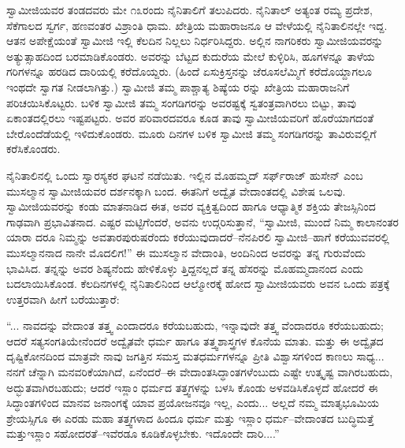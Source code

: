 ಸ್ವಾಮೀಜಿಯವರ ತಂಡದವರು ಮೇ ೧೩ರಂದು ನೈನಿತಾಲಿಗೆ ತಲುಪಿದರು. ನೈನಿತಾಲ್ ಅತ್ಯಂತ ರಮ್ಯ ಪ್ರದೇಶ, ಸೆಕೆಗಾಲದ ಸ್ವರ್ಗ, ಹಣವಂತರ ವಿಶ್ರಾಂತಿ ಧಾಮ. ಖೇತ್ರಿಯ ಮಹಾರಾಜನೂ ಆ ವೇಳೆಯಲ್ಲಿ ನೈನಿತಾಲಿನಲ್ಲೇ ಇದ್ದ. ಆತನ ಅಪೇಕ್ಷೆಯಂತೆ ಸ್ವಾಮೀಜಿ ಇಲ್ಲಿ ಕೆಲದಿನ ನಿಲ್ಲಲು ನಿರ್ಧರಿಸಿದ್ದರು. ಅಲ್ಲಿನ ನಾಗರಿಕರು ಸ್ವಾಮೀಜಿಯವರನ್ನು ಅತ್ಯುತ್ಸಾಹದಿಂದ ಬರಮಾಡಿಕೊಂಡರು. ಅವರನ್ನು ಬೆಟ್ಟದ ಕುದುರೆಯ ಮೇಲೆ ಕುಳ್ಳಿರಿಸಿ, ಹೂಗಳನ್ನೂ ತಾಳೆಯ ಗರಿಗಳನ್ನೂ ಹರಡಿದ ದಾರಿಯಲ್ಲಿ ಕರೆದೊಯ್ದರು. (ಹಿಂದೆ ಏಸುಕ್ರಿಸ್ತನನ್ನು ಜೆರೂಸಲೆಮ್ಮಿಗೆ ಕರೆದೊಯ್ದಾಗಲೂ ಇಂಥದೇ ಸ್ವಾಗತ ನೀಡಲಾಗಿತ್ತು.) ಸ್ವಾಮೀಜಿ ತಮ್ಮ ಪಾಶ್ಚಾತ್ಯ ಶಿಷ್ಯೆಯ ರನ್ನು ಖೇತ್ರಿಯ ಮಹಾರಾಜನಿಗೆ ಪರಿಚಯಿಸಿಕೊಟ್ಟರು. ಬಳಿಕ ಸ್ವಾಮೀಜಿ ತಮ್ಮ ಸಂಗಡಿಗರನ್ನು ಅವರಷ್ಟಕ್ಕೆ ಸ್ವತಂತ್ರವಾಗಿರಲು ಬಿಟ್ಟು, ತಾವು ಏಕಾಂತದಲ್ಲಿರಲು ಇಷ್ಟಪಟ್ಟರು. ಅವರ ಪರಿವಾರದವರೂ ಕೂಡ ತಾವು ಸ್ವಾಮೀಜಿಯವರಿಗೆ ಹೊರೆಯಾಗದಂತೆ ಬೇರೊಂದೆಡೆಯಲ್ಲಿ ಇಳಿದುಕೊಂಡರು. ಮೂರು ದಿನಗಳ ಬಳಿಕ ಸ್ವಾಮೀಜಿ ತಮ್ಮ ಸಂಗಡಿಗರನ್ನು ತಾವಿರುವಲ್ಲಿಗೆ ಕರೆಸಿಕೊಂಡರು.

ನೈನಿತಾಲಿನಲ್ಲಿ ಒಂದು ಸ್ವಾರಸ್ಯಕರ ಘಟನೆ ನಡೆಯಿತು. ಇಲ್ಲಿನ ಮೊಹಮ್ಮದ್ ಸರ್ಫ್​ರಾಜ್ ಹುಸೇನ್ ಎಂಬ ಮುಸಲ್ಮಾನ ಸ್ವಾಮೀಜಿಯವರ ದರ್ಶನಕ್ಕಾಗಿ ಬಂದ. ಈತನಿಗೆ ಅದ್ವೈತ ವೇದಾಂತದಲ್ಲಿ ವಿಶೇಷ ಒಲವು. ಸ್ವಾಮೀಜಿಯವರನ್ನು ಕಂಡು ಮಾತನಾಡಿದ ಈತ, ಅವರ ವ್ಯಕ್ತಿತ್ವದಿಂದ ಹಾಗೂ ಆಧ್ಯಾತ್ಮಿಕ ಶಕ್ತಿಯ ತೇಜಸ್ಸಿನಿಂದ ಗಾಢವಾಗಿ ಪ್ರಭಾವಿತನಾದ. ಎಷ್ಟರ ಮಟ್ಟಿಗೆಂದರೆ, ಅವನು ಉದ್ಗರಿಸುತ್ತಾನೆ, “ಸ್ವಾಮೀಜಿ, ಮುಂದೆ ನಿಮ್ಮ ಕಾಲಾನಂತರ ಯಾರಾ ದರೂ ನಿಮ್ಮನ್ನು ಅವತಾರಪುರುಷರೆಂದು ಕರೆಯುವುದಾದರೆ–ನೆನಪಿರಲಿ ಸ್ವಾಮೀಜಿ–ಹಾಗೆ ಕರೆಯುವವರಲ್ಲಿ ಮುಸಲ್ಮಾನನಾದ ನಾನೇ ಮೊದಲಿಗ!” ಈ ಮುಸಲ್ಮಾನ ವೇದಾಂತಿ, ಅಂದಿನಿಂದ ಅವರನ್ನು ತನ್ನ ಗುರುವೆಂದು ಭಾವಿಸಿದ. ತನ್ನನ್ನು ಅವರ ಶಿಷ್ಯನೆಂದು ಹೇಳಿಕೊಳ್ಳು ತ್ತಿದ್ದನಲ್ಲದೆ ತನ್ನ ಹೆಸರನ್ನು ಮೊಹಮ್ಮದಾನಂದ ಎಂದು ಬದಲಾಯಿಸಿಕೊಂಡ. ಕೆಲದಿನಗಳಲ್ಲಿ ನೈನಿತಾಲಿನಿಂದ ಆಲ್ಮೋರಕ್ಕೆ ಹೋದ ಸ್ವಾಮೀಜಿಯವರು ಅವನ ಒಂದು ಪತ್ರಕ್ಕೆ ಉತ್ತರವಾಗಿ ಹೀಗೆ ಬರೆಯುತ್ತಾರೆ:

“... ನಾವದನ್ನು ವೇದಾಂತ ತತ್ತ್ವ ಎಂದಾದರೂ ಕರೆಯಬಹುದು, ಇನ್ನಾವುದೇ ತತ್ತ್ವ ವೆಂದಾದರೂ ಕರೆಯಬಹುದು; ಆದರೆ ಸತ್ಯಸಂಗತಿಯೇನೆಂದರೆ ಅದ್ವೈತವೇ ಧರ್ಮ ಹಾಗೂ ತತ್ತ್ವಶಾಸ್ತ್ರಗಳ ಕೊನೆಯ ಮಾತು. ಮತ್ತು ಈ ಅದ್ವೈತದ ದೃಷ್ಟಿಕೋನದಿಂದ ಮಾತ್ರವೇ ನಾವು ಜಗತ್ತಿನ ಸಮಸ್ತ ಮತಧರ್ಮಗಳನ್ನೂ ಪ್ರೀತಿ ವಿಶ್ವಾಸಗಳಿಂದ ಕಾಣಲು ಸಾಧ್ಯ... ನನಗೆ ಚೆನ್ನಾಗಿ ಮನವರಿಕೆಯಾಗಿದೆ, ಏನೆಂದರೆ–ಈ ವೇದಾಂತಸಿದ್ಧಾಂತಗಳೆಂಬುದು ಎಷ್ಟೇ ಉತ್ಕೃಷ್ಟ ವಾಗಿರಬಹುದು, ಅದ್ಭುತವಾಗಿರಬಹುದು; ಆದರೆ ಇಸ್ಲಾಂ ಧರ್ಮದ ತತ್ತ್ವಗಳನ್ನು ಬಳಸಿ ಕೊಂಡು ಅಳವಡಿಸಿಕೊಳ್ಳದೆ ಹೋದರೆ ಈ ಸಿದ್ಧಾಂತಗಳಿಂದ ಮಾನವ ಜನಾಂಗಕ್ಕೆ ಯಾವ ಪ್ರಯೋಜನವೂ ಇಲ್ಲ, ಎಂದು... ಅಲ್ಲದೆ ನಮ್ಮ ಮಾತೃಭೂಮಿಯ ಶ್ರೇಯಸ್ಸಿಗೂ ಈ ಎರಡು ಮಹಾ ತತ್ತ್ವಗಳಾದ ಹಿಂದೂ ಧರ್ಮ ಮತ್ತು ಇಸ್ಲಾಂ ಧರ್ಮ–ವೇದಾಂತದ ಬುದ್ಧಿಮತ್ತೆ ಮತ್ತುಇಸ್ಲಾಂ ಸಹೋದರತೆ–ಇವೆರಡೂ ಕೂಡಿಕೊಳ್ಳಬೇಕು. ಇದೊಂದೇ ದಾರಿ....”

